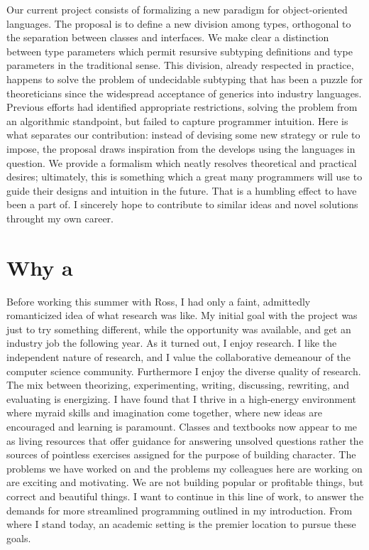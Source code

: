 \documentclass{article}
\begin{document}
Our current project consists of formalizing a new paradigm for object-oriented languages.
The proposal is to define a new division among types, orthogonal to the separation between classes and interfaces.
We make clear a distinction between type parameters which permit resursive subtyping definitions and type parameters in the traditional sense.
This division, already respected in practice, happens to solve the problem of undecidable subtyping that has been a puzzle for theoreticians since the widespread acceptance of generics into industry languages.
Previous efforts had identified appropriate restrictions, solving the problem from an algorithmic standpoint, but failed to capture programmer intuition.
Here is what separates our contribution: instead of devising some new strategy or rule to impose, the proposal draws inspiration from the develops using the languages in question.
We provide a formalism which neatly resolves theoretical and practical desires; ultimately, this is something which a great many programmers will use to guide their designs and intuition in the future.
That is a humbling effect to have been a part of.
I sincerely hope to contribute to similar ideas and novel solutions throught my own career.

\section{Why a \phd}

Before working this summer with Ross, I had only a faint, admittedly romanticized idea of what research was like.
My initial goal with the project was just to try something different, while the opportunity was available, and get an industry job the following year.
As it turned out, I enjoy research. 
I like the independent nature of research, and I value the collaborative demeanour of the computer science community.
Furthermore I enjoy the diverse quality of research. 
The mix between theorizing, experimenting, writing, discussing, rewriting, and evaluating is energizing.
I have found that I thrive in a high-energy environment where myraid skills and imagination come together, where new ideas are encouraged and learning is paramount.
Classes and textbooks now appear to me as living resources that offer guidance for answering unsolved questions rather the sources of pointless exercises assigned for the purpose of building character.
The problems we have worked on and the problems my colleagues here are working on are exciting and motivating.
We are not building popular or profitable things, but correct and beautiful things.
I want to continue in this line of work, to answer the demands for more streamlined programming outlined in my introduction.
From where I stand today, an academic setting is the premier location to pursue these goals.
\end{document}

